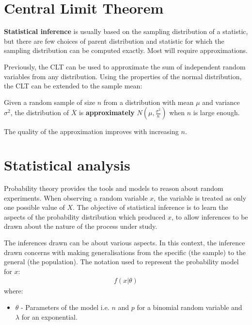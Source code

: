 \documentclass[10pt,a4paper]{article}
\begin{document}
\section{Central Limit Theorem}

\textbf{Statistical inference} is usually based on the sampling distribution of a statistic, but
there are few choices of parent distribution and statistic for which the sampling distribution can
be computed exactly. Most will require approximations.

Previously, the CLT can be used to approximate the sum of independent random variables from any distribution.
Using the properties of the normal distribution, the CLT can be extended to the sample mean:

\begin{tcolorbox}[breakable,colback=white]
    Given a random sample of size $n$ from a distribution with mean $\mu$ and variance $\sigma^2$,
    the distribution of $\overline{X}$ is \textbf{approximately} $N\left(\mu, \frac{\sigma^2}{n}\right)$ when
    $n$ is large enough.
\end{tcolorbox}

The quality of the approximation improves with increasing $n$.

\section{Statistical analysis}

Probability theory provides the tools and models to reason about random experiments. When observing
a random variable $x$, the variable is treated as only one possible value of $X$. The objective of
statistical inference is to learn the aspects of the probability distribution which produced $x$, to
allow inferences to be drawn about the nature of the process under study.

The inferences drawn can be about various aspects. In this context, the inference drawn concerns with making
generalisations from the speciﬁc (the sample) to the general (the population). The notation used to represent the probability model for $x$:
\begin{align*}
    f(x|\theta)
\end{align*}
where:
\begin{itemize}
    \item $\theta$ - Parameters of the model i.e. $n$ and $p$ for a binomial random variable and $\lambda$ for an exponential.
\end{itemize}
\end{document}
